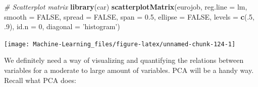 \documentclass[]{book}
\newenvironment{Shaded}{\begin{snugshade}}{\end{snugshade}}
\newcommand{\KeywordTok}[1]{\textcolor[rgb]{0.13,0.29,0.53}{\textbf{#1}}}
\newcommand{\DataTypeTok}[1]{\textcolor[rgb]{0.13,0.29,0.53}{#1}}
\newcommand{\DecValTok}[1]{\textcolor[rgb]{0.00,0.00,0.81}{#1}}
\newcommand{\FloatTok}[1]{\textcolor[rgb]{0.00,0.00,0.81}{#1}}
\newcommand{\StringTok}[1]{\textcolor[rgb]{0.31,0.60,0.02}{#1}}
\newcommand{\CommentTok}[1]{\textcolor[rgb]{0.56,0.35,0.01}{\textit{#1}}}
\newcommand{\OtherTok}[1]{\textcolor[rgb]{0.56,0.35,0.01}{#1}}
\newcommand{\NormalTok}[1]{#1}
\theoremstyle{definition}
\theoremstyle{definition}
\theoremstyle{definition}
\theoremstyle{remark}
\begin{document}
\begin{Shaded}
\begin{Highlighting}[]
\CommentTok{# Scatterplot matrix}
\KeywordTok{library}\NormalTok{(car)}
\KeywordTok{scatterplotMatrix}\NormalTok{(eurojob, }\DataTypeTok{reg.line =}\NormalTok{ lm, }\DataTypeTok{smooth =} \OtherTok{FALSE}\NormalTok{, }\DataTypeTok{spread =} \OtherTok{FALSE}\NormalTok{,}
                  \DataTypeTok{span =} \FloatTok{0.5}\NormalTok{, }\DataTypeTok{ellipse =} \OtherTok{FALSE}\NormalTok{, }\DataTypeTok{levels =} \KeywordTok{c}\NormalTok{(.}\DecValTok{5}\NormalTok{, .}\DecValTok{9}\NormalTok{), }\DataTypeTok{id.n =} \DecValTok{0}\NormalTok{,}
                  \DataTypeTok{diagonal =} \StringTok{'histogram'}\NormalTok{)}
\end{Highlighting}
\end{Shaded}

\begin{center}\texttt{[image: Machine-Learning\_files/figure-latex/unnamed-chunk-124-1]} \end{center}

We definitely need a way of visualizing and quantifying the relations
between variables for a moderate to large amount of variables. PCA will
be a handy way. Recall what PCA does:
\end{document}
